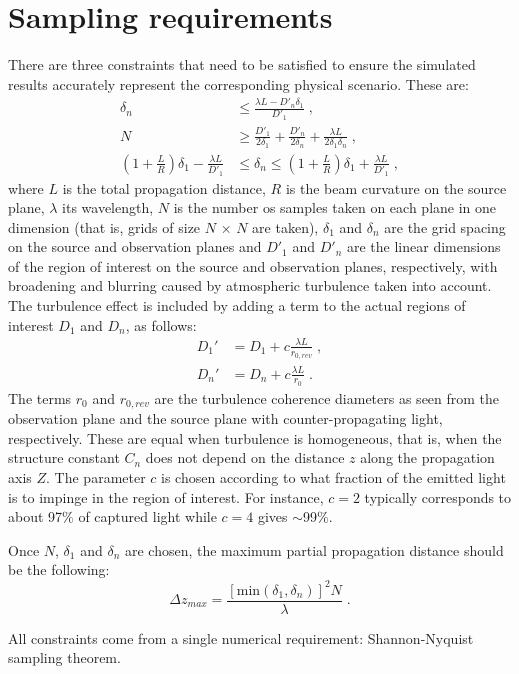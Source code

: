 \documentclass[12pt]{article}
\begin{document}
\section{Sampling requirements}
There are three constraints that need to be satisfied to ensure the simulated results accurately represent the corresponding physical scenario. These are:
\begin{subequations}
\begin{align}
\delta_n &\leq \frac{\lambda L - D'_n \delta_1}{D'_1} \; ,\\
N &\geq \frac{D'_1}{2\delta_1}+\frac{D'_n}{2\delta_n} + \frac{\lambda L}{2\delta_1\delta_n} \; ,\\
\left( 1+\frac{L}{R}\right) \delta_1 -\frac{\lambda L}{D'_1} & \leq \delta_n \leq  \left( 1+\frac{L}{R}\right) \delta_1 + \frac{\lambda L}{D'_1} \; ,
\end{align}
\end{subequations}
where $L$ is the total propagation distance, $R$ is the beam curvature on the source plane, $\lambda$ its wavelength, $N$ is the number os samples taken on each plane in one dimension (that is, grids of size $N\,\times\,N$ are taken), $\delta_1$ and $\delta_n$ are the grid spacing on the source and observation planes and $D'_1$ and $D'_n$ are the linear dimensions of the region of interest on the source and observation planes, respectively, with broadening and blurring caused by atmospheric turbulence taken into account. The turbulence effect is included by adding a term to the actual regions of interest $D_1$ and $D_n$, as follows:
\begin{subequations}
\begin{align}
D_1' &= D_1 +c\frac{\lambda L}{r_{0,rev}} \; , \\
D_n' &= D_n +c\frac{\lambda L}{r_0} \; .
\end{align}
\end{subequations}
The terms $r_0$ and $r_{0,rev}$ are the turbulence coherence diameters as seen from the observation plane and the source plane with counter-propagating light, respectively. These are equal when turbulence is homogeneous, that is, when the structure constant $C_n$ does not depend on the distance $z$ along the propagation axis $Z$. The parameter $c$ is chosen according to what fraction of the emitted light is to impinge in the region of interest. For instance, $c=2$ typically corresponds to about 97$\%$ of captured light while $c=4$ gives $\sim$99$\%$.

Once $N$, $\delta_1$ and $\delta_n$ are chosen, the maximum partial propagation distance should be the following:
\begin{equation}
\Delta z_{max} = \frac{ \left[ \mathrm{min}(\delta_1,\delta_n)\right]^2 N}{\lambda} \; .
\end{equation}

All constraints come from a single numerical requirement: Shannon-Nyquist sampling theorem.
\end{document}
